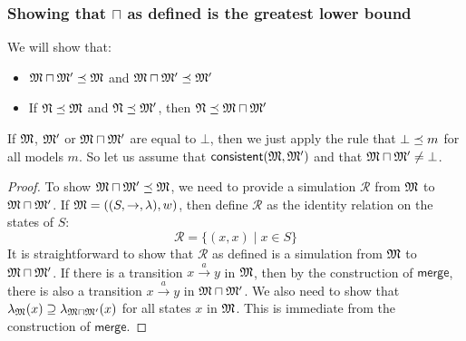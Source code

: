 \subsubsection{Showing that $\sqcap$ as defined is the greatest lower bound}
We will show that:
\begin{itemize}
\item
$\frak{M} \sqcap \frak{M}' \preceq \frak{M}$ and $\frak{M} \sqcap \frak{M}' \preceq \frak{M}'$
\item
If $\frak{N} \preceq \frak{M}$ and $\frak{N} \preceq \frak{M}'$, then $\frak{N} \preceq \frak{M} \sqcap \frak{M}'$
\end{itemize}
If $\frak{M}$, $ \frak{M}'$ or $\frak{M} \sqcap \frak{M}'$ are equal to $\bot$, then we just apply the rule that $\bot \preceq m$ for all models $m$. 
So let us assume that $\mathsf{consistent}(\frak{M}, \frak{M}')$ and that $\frak{M} \sqcap \frak{M}'  \neq \bot$.

\begin{proof}
To show $\frak{M} \sqcap \frak{M}' \preceq \frak{M}$, we need to provide a simulation $\mathcal{R}$ from $\frak{M}$ to  $\frak{M} \sqcap \frak{M}'$.
If $\frak{M} = ((S,\rightarrow,\lambda),w)$, then define $\mathcal{R}$ as the identity relation on the states of $S$:
\[
\mathcal{R} = \{(x,x) \; | \; x \in S\}
\]
It is straightforward to show that $\mathcal{R}$ as defined is a simulation from $\frak{M}$ to  $\frak{M} \sqcap \frak{M}'$.
If there is a transition $x \xrightarrow{a} y$ in $\frak{M}$, then by the construction of $\mathsf{merge}$, there is also a transition $x \xrightarrow{a} y$ in $\frak{M} \sqcap \frak{M}'$.
We also need to show that $\lambda_{\frak{M}}(x) \supseteq \lambda_{\frak{M} \sqcap \frak{M}'}(x)$ for all states $x$ in $\frak{M}$. This is immediate from the construction of $\mathsf{merge}$.

\end{proof}

